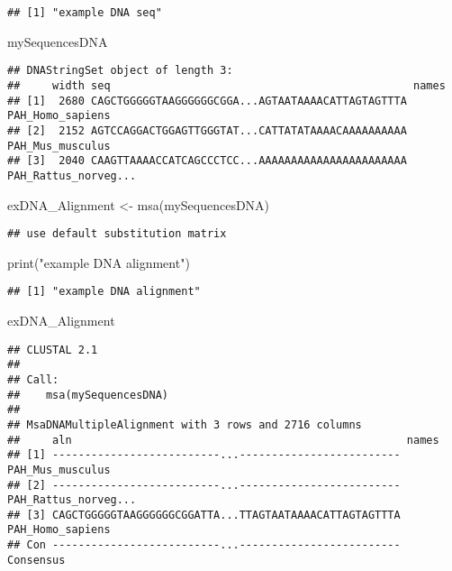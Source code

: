 \documentclass[
]{article}
\newenvironment{Shaded}{\begin{snugshade}}{\end{snugshade}}
\newcommand{\FunctionTok}[1]{\textcolor[rgb]{0.00,0.00,0.00}{#1}}
\newcommand{\NormalTok}[1]{#1}
\newcommand{\OtherTok}[1]{\textcolor[rgb]{0.56,0.35,0.01}{#1}}
\newcommand{\StringTok}[1]{\textcolor[rgb]{0.31,0.60,0.02}{#1}}
\begin{document}
\begin{verbatim}
## [1] "example DNA seq"
\end{verbatim}

\begin{Shaded}
\begin{Highlighting}[]
\NormalTok{mySequencesDNA}
\end{Highlighting}
\end{Shaded}

\begin{verbatim}
## DNAStringSet object of length 3:
##     width seq                                               names               
## [1]  2680 CAGCTGGGGGTAAGGGGGGCGGA...AGTAATAAAACATTAGTAGTTTA PAH_Homo_sapiens
## [2]  2152 AGTCCAGGACTGGAGTTGGGTAT...CATTATATAAAACAAAAAAAAAA PAH_Mus_musculus
## [3]  2040 CAAGTTAAAACCATCAGCCCTCC...AAAAAAAAAAAAAAAAAAAAAAA PAH_Rattus_norveg...
\end{verbatim}

\begin{Shaded}
\begin{Highlighting}[]
\NormalTok{exDNA\_Alignment }\OtherTok{\textless{}{-}} \FunctionTok{msa}\NormalTok{(mySequencesDNA)}
\end{Highlighting}
\end{Shaded}

\begin{verbatim}
## use default substitution matrix
\end{verbatim}

\begin{Shaded}
\begin{Highlighting}[]
\FunctionTok{print}\NormalTok{(}\StringTok{"example DNA alignment"}\NormalTok{)}
\end{Highlighting}
\end{Shaded}

\begin{verbatim}
## [1] "example DNA alignment"
\end{verbatim}

\begin{Shaded}
\begin{Highlighting}[]
\NormalTok{exDNA\_Alignment}
\end{Highlighting}
\end{Shaded}

\begin{verbatim}
## CLUSTAL 2.1  
## 
## Call:
##    msa(mySequencesDNA)
## 
## MsaDNAMultipleAlignment with 3 rows and 2716 columns
##     aln                                                    names
## [1] --------------------------...------------------------- PAH_Mus_musculus
## [2] --------------------------...------------------------- PAH_Rattus_norveg...
## [3] CAGCTGGGGGTAAGGGGGGCGGATTA...TTAGTAATAAAACATTAGTAGTTTA PAH_Homo_sapiens
## Con --------------------------...------------------------- Consensus
\end{verbatim}
\end{document}
